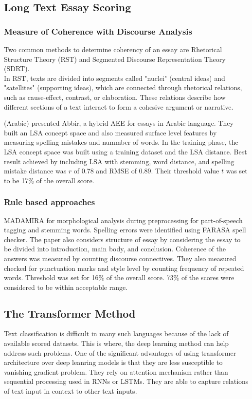 \documentclass{article}
\begin{document}
\subsection{Long Text Essay Scoring}
\subsubsection*{Measure of Coherence with Discourse Analysis}
Two common methods to determine coherency of an essay are Rhetorical Structure Theory (RST) and Segmented Discourse Representation Theory (SDRT). \\ In RST, texts are divided into segments called "nuclei" (central ideas) and "satellites" (supporting ideas), which are connected through rhetorical relations, such as cause-effect, contrast, or elaboration. These relations describe how different sections of a text interact to form a cohesive argument or narrative. 

\textbf{\textcite{6_ghamdi2014hybridarabic}} (Arabic) presented Abbir, a hybrid AEE for essays in Arabic language. They built an LSA concept space and also measured surface level features by measuring spelling mistakes and nummber of words. In the training phase, the LSA concept space was built using a training dataset and the LSA distance. Best result achieved by including LSA with stemming, word distance, and spelling mistake distance was $r$ of 0.78 and RMSE of 0.89. Their threshold value $t$ was set to be 17\% of the overall score. 

\subsubsection*{Rule based approaches}
\textbf{\textcite{7_qahtani2019rulebased}} MADAMIRA \cite{pasha2014madamira} for morphological analysis during preprocessing for part-of-speech tagging and stemming words. Spelling errors were identified using FARASA spell checker. The paper also considers structure of essay by considering the essay to be divided into introduction, main body, and conclusion. Coherence of the answers was measured by counting discourse connectives. They also measured checked for punctuation marks and style level by counting frequency of repeated words. Threshold was set for 16\% of the overall score. 73\% of the scores were considered to be within acceptable range.


\subsection{The Transformer Method}
Text classification is difficult in many such languages because of the lack of available scored datasets. This is where, the deep learning method can help address such problems. One of the significant advantages of using transformer architecture over deep leanring models is that they are less susceptible to vanishing gradient problem. They rely on attention mechanism rather than sequential processing used in RNNs or LSTMs. They are able to capture relations of text input in context to other text inputs. 
\end{document}
